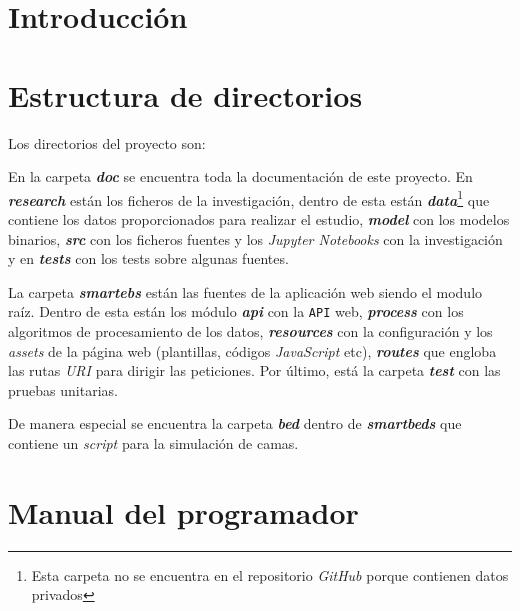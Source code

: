 
\section{Introducción}

\section{Estructura de directorios}

Los directorios del proyecto son:


En la carpeta \textit{\textbf{doc}} se encuentra toda la documentación de este proyecto. En \textit{\textbf{research}} están los ficheros de la investigación, dentro de esta están \textit{\textbf{data}}\footnote{Esta carpeta no se encuentra en el repositorio \textit{GitHub} porque contienen datos privados} que contiene los datos proporcionados para realizar el estudio, \textit{\textbf{model}} con los modelos binarios, \textit{\textbf{src}} con los ficheros fuentes y los \textit{Jupyter Notebooks} con la investigación y en \textit{\textbf{tests}} con los tests sobre algunas fuentes.

La carpeta \textbf{\textit{smartebs}} están las fuentes de la aplicación web siendo el modulo raíz. Dentro de esta están los módulo \textit{\textbf{api}} con la \texttt{API} web, \textit{\textbf{process}} con los algoritmos de procesamiento de los datos, \textit{\textbf{resources}} con la configuración y los \textit{assets} de la página web (plantillas, códigos \textit{JavaScript} etc), \textit{\textbf{routes}} que engloba las rutas \textit{URI} para dirigir las peticiones. Por último, está la carpeta \textit{\textbf{test}} con las pruebas unitarias.

De manera especial se encuentra la carpeta \textit{\textbf{bed}} dentro de \textbf{\textit{smartbeds}} que contiene un \textit{script} para la simulación de camas.
\section{Manual del programador}


